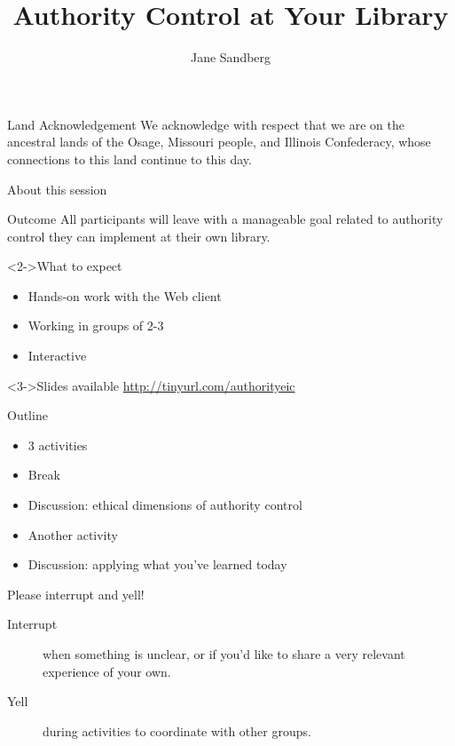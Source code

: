 \documentclass{beamer}
\begin{document}
\title{Authority Control at Your Library}
\author{Jane Sandberg}


\begin{frame}
 \titlepage
\end{frame}


\begin{frame}{Land Acknowledgement}
We acknowledge with respect that we are on the ancestral lands of the Osage, Missouri people, and Illinois Confederacy, whose connections to this land continue to this day.

\end{frame}


\begin{frame}{About this session}
\begin{block}{Outcome}
 All participants will leave with a manageable goal related to authority control they can implement at their own library.
\end{block}
\begin{block}<2->{What to expect}
\begin{itemize}
 \item Hands-on work with the Web client
 \item Working in groups of 2-3
 \item Interactive
\end{itemize}

\end{block}
\begin{block}<3->{Slides available}
\url{http://tinyurl.com/authorityeic}
\end{block}


\end{frame}

\begin{frame}{Outline}
\begin{itemize}
 \item 3 activities
 \item Break
 \item Discussion: ethical dimensions of authority control
 \item Another activity
 \item Discussion: applying what you've learned today
\end{itemize}


\end{frame}

\begin{frame}{Please interrupt and yell!}

 \begin{description}
  \item[Interrupt] when something is unclear, or if you'd like to share a very relevant experience of your own.
  \item[Yell] during activities to coordinate with other groups.
 \end{description}


\end{frame}
\end{document}
